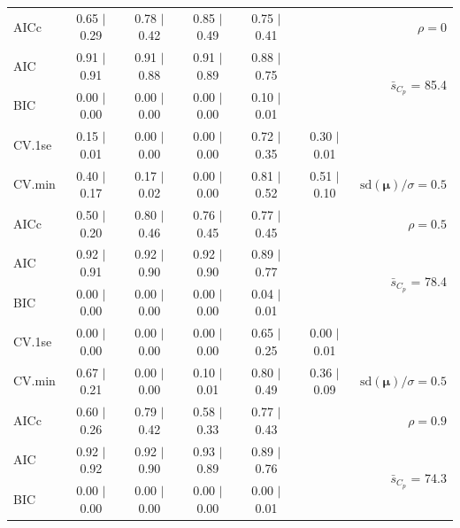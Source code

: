 \documentclass[12pt]{article}
\newcommand{\mr}[1]{\mathrm{#1}}
\newcommand{\bm}[1]{\mathbf{#1}}
\begin{document}
\begin{table}[p]
\begin{center}
\begin{tabular}{l*{5}{c}|r}
AICc & 0.65 $\mid$ 0.29 & 0.78 $\mid$ 0.42 & 0.85 $\mid$ 0.49 & 0.75 $\mid$ 0.41 & & $\rho=0$ \\
AIC & 0.91 $\mid$ 0.91 & 0.91 $\mid$ 0.88 & 0.91 $\mid$ 0.89 & 0.88 $\mid$ 0.75 & & \multirow{2}{*}{$\bar{s}_{C_p}$ = 85.4} \\
BIC & 0.00 $\mid$ 0.00 & 0.00 $\mid$ 0.00 & 0.00 $\mid$ 0.00 & 0.10 $\mid$ 0.01 & & \\
 \hline 
CV.1se & 0.15 $\mid$ 0.01 & 0.00 $\mid$ 0.00 & 0.00 $\mid$ 0.00 & 0.72 $\mid$ 0.35 & 0.30 $\mid$ 0.01 &\\
CV.min & 0.40 $\mid$ 0.17 & 0.17 $\mid$ 0.02 & 0.00 $\mid$ 0.00 & 0.81 $\mid$ 0.52 & 0.51 $\mid$ 0.10 &  $\mr{sd}(\bm{\mu})/\sigma=0.5$ \\
AICc & 0.50 $\mid$ 0.20 & 0.80 $\mid$ 0.46 & 0.76 $\mid$ 0.45 & 0.77 $\mid$ 0.45 & & $\rho=0.5$ \\
AIC & 0.92 $\mid$ 0.91 & 0.92 $\mid$ 0.90 & 0.92 $\mid$ 0.90 & 0.89 $\mid$ 0.77 & & \multirow{2}{*}{$\bar{s}_{C_p}$ = 78.4} \\
BIC & 0.00 $\mid$ 0.00 & 0.00 $\mid$ 0.00 & 0.00 $\mid$ 0.00 & 0.04 $\mid$ 0.01 & & \\
 \hline 
CV.1se & 0.00 $\mid$ 0.00 & 0.00 $\mid$ 0.00 & 0.00 $\mid$ 0.00 & 0.65 $\mid$ 0.25 & 0.00 $\mid$ 0.01 &\\
CV.min & 0.67 $\mid$ 0.21 & 0.00 $\mid$ 0.00 & 0.10 $\mid$ 0.01 & 0.80 $\mid$ 0.49 & 0.36 $\mid$ 0.09 &  $\mr{sd}(\bm{\mu})/\sigma=0.5$ \\
AICc & 0.60 $\mid$ 0.26 & 0.79 $\mid$ 0.42 & 0.58 $\mid$ 0.33 & 0.77 $\mid$ 0.43 & & $\rho=0.9$ \\
AIC & 0.92 $\mid$ 0.92 & 0.92 $\mid$ 0.90 & 0.93 $\mid$ 0.89 & 0.89 $\mid$ 0.76 & & \multirow{2}{*}{$\bar{s}_{C_p}$ = 74.3} \\
BIC & 0.00 $\mid$ 0.00 & 0.00 $\mid$ 0.00 & 0.00 $\mid$ 0.00 & 0.00 $\mid$ 0.01 & & \\
 \hline
 \end{tabular}
\end{center}
\vspace{-1cm}
\end{table}
\end{document}
